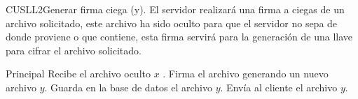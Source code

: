 


\begin{UseCase}{CUSLL2}{Generar firma ciega (y). }{El servidor realizará una firma a ciegas de un archivo solicitado, este archivo ha sido oculto para que el servidor no sepa de donde proviene o que contiene, esta firma servirá para la generación de una llave para cifrar el archivo solicitado.}

\end{UseCase}


\begin{UCtrayectoria}{Principal}
	\UCpaso Recibe el archivo oculto $x$ .
	\UCpaso Firma el archivo generando un nuevo archivo $y$.
	\UCpaso Guarda en la base de datos el archivo $y$.
	\UCpaso Envía al cliente el archivo $y$.
\end{UCtrayectoria}


		

